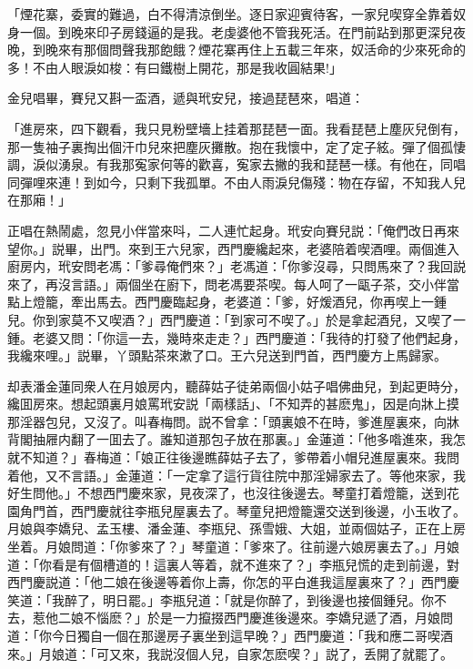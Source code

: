 「煙花寨，委實的難過，白不得清涼倒坐。逐日家迎賓待客，一家兒喫穿全靠着奴身一個。到晚來印子房錢逼的是我。老虔婆他不管我死活。在門前跕到那更深兒夜晚，到晚來有那個問聲我那飽餓？煙花寨再住上五載三年來，奴活命的少來死命的多！不由人眼淚如梭：有曰鐵樹上開花，那是我收圓結果!」

金兒唱畢，賽兒又斟一盃酒，遞與玳安兒，接過琵琶來，唱道：

「進房來，四下觀看，我只見粉壁墻上挂着那琵琶一面。我看琵琶上塵灰兒倒有，那一隻袖子裏掏出個汗巾兒來把塵灰攤散。抱在我懷中，定了定子絃。彈了個孤悽調，淚似湧泉。有我那寃家何等的歡喜，寃家去撇的我和琵琶一樣。有他在，同唱同彈哩來連！到如今，只剩下我孤單。不由人雨淚兒傷殘：物在存留，不知我人兒在那廂！」

正唱在熱鬧處，忽見小伴當來呌，二人連忙起身。玳安向賽兒説：「俺們改日再來望你。」説畢，出門。來到王六兒家，西門慶纔起來，老婆陪着喫酒哩。兩個進入廚房内，玳安問老馮：「爹尋俺們來？」老馮道：「你爹沒尋，只問馬來了？我回説來了，再沒言語。」兩個坐在廚下，問老馮要茶喫。每人呵了一甌子茶，交小伴當點上燈籠，牽出馬去。西門慶臨起身，老婆道：「爹，好煖酒兒，你再喫上一鍾兒。你到家莫不又喫酒？」西門慶道：「到家可不喫了。」於是拿起酒兒，又喫了一鍾。老婆又問：「你這一去，幾時來走走？」西門慶道：「我待的打發了他們起身，我纔來哩。」説畢，丫頭點茶來漱了口。王六兒送到門首，西門慶方上馬歸家。

却表潘金蓮同衆人在月娘房内，聽薛姑子徒弟兩個小姑子唱佛曲兒，到起更時分，纔囬房來。想起頭裏月娘罵玳安説「兩樣話」、「不知弄的甚麽鬼」，因是向牀上摸那淫器包兒，又沒了。叫春梅問。説不曾拿：「頭裏娘不在時，爹進屋裏來，向牀背閣抽屜内翻了一囬去了。誰知道那包子放在那裏。」金蓮道：「他多喒進來，我怎就不知道？」春梅道：「娘正往後邊瞧薛姑子去了，爹帶着小帽兒進屋裏來。我問着他，又不言語。」金蓮道：「一定拿了這行貨往院中那淫婦家去了。等他來家，我好生問他。」不想西門慶來家，見夜深了，也沒往後邊去。琴童打着燈籠，送到花園角門首，西門慶就往李瓶兒屋裏去了。琴童兒把燈籠還交送到後邊，小玉收了。月娘與李嬌兒、孟玉樓、潘金蓮、李瓶兒、孫雪娥、大姐，並兩個姑子，正在上房坐着。月娘問道：「你爹來了？」琴童道：「爹來了。往前邊六娘房裏去了。」月娘道：「你看是有個槽道的！這裏人等着，就不進來了？」李瓶兒慌的走到前邊，對西門慶説道：「他二娘在後邊等着你上壽，你怎的平白進我這屋裏來了？」西門慶笑道：「我醉了，明日罷。」李瓶兒道：「就是你醉了，到後邊也接個鍾兒。你不去，惹他二娘不惱麽？」於是一力攛掇西門慶進後邊來。李嬌兒遞了酒，月娘問道：「你今日獨自一個在那邊房子裏坐到這早晚？」西門慶道：「我和應二哥喫酒來。」月娘道：「可又來，我説沒個人兒，自家怎麽喫？」説了，丢開了就罷了。

